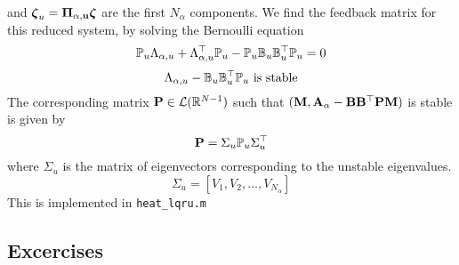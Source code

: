 \documentclass[12pt]{article}
\begin{document}
and $\boldsymbol{\zeta}_u = \mathbf{\Pi_{\alpha,u}} \boldsymbol{\zeta}$ are the first $N_\alpha$ components. We find the feedback matrix for this reduced system, by solving the Bernoulli equation
\begin{equation}
 \mathbb{P}_u \Lambda_{\alpha,u} + \Lambda^\top_{\alpha,u} \mathbb{P}_u - \mathbb{P}_u \mathbb{B}_u \mathbb{B}_u^\top \mathbb{P}_u = 0
\label{eq:ricu}
\end{equation}
\[
 \Lambda_{\alpha,u} - \mathbb{B}_u \mathbb{B}_u^\top \mathbb{P}_u \text{ is stable}
\]
The corresponding matrix ${\mathbf P} \in \mathcal{L}(\mathbb{R}^{N-1})$ such that $({\mathbf M},{\mathbf A}_\alpha - {\mathbf B}{\mathbf B}^\top{\mathbf P}{\mathbf M})$ is stable is given by
\[
 {\mathbf P} = \Sigma_u \mathbb{P}_u \Sigma^\top_u
\]
where $\Sigma_u$ is the matrix of eigenvectors corresponding to the unstable eigenvalues.
\[
\Sigma_u = [ V_1, V_2, \ldots, V_{N_\alpha}]
\]
This is implemented in {\tt heat\_lqru.m}

\subsection{Excercises}
\end{document}
